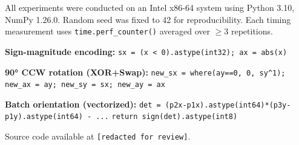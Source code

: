 \documentclass[11pt,letterpaper]{article}
\begin{document}
All experiments were conducted on an Intel x86-64 system using Python 3.10, NumPy 1.26.0.
Random seed was fixed to 42 for reproducibility.  Each timing measurement uses
\texttt{time.perf\_counter()} averaged over $\ge$3 repetitions.

\textbf{Sign-magnitude encoding:}
\texttt{sx = (x < 0).astype(int32); ax = abs(x)}

\textbf{90° CCW rotation (XOR+Swap):}
\texttt{new\_sx = where(ay==0, 0, sy\^{}1); new\_ax = ay; new\_sy = sx; new\_ay = ax}

\textbf{Batch orientation (vectorized):}
\texttt{det = (p2x-p1x).astype(int64)*(p3y-p1y).astype(int64) - ...}
\texttt{return sign(det).astype(int8)}

Source code available at \texttt{[redacted for review]}.
\end{document}
